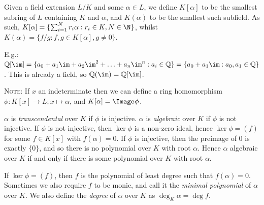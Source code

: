 \documentclass[a4paper, 10pt, twocolumn]{amsart}
\begin{document}
Given a field extension $L/K$ and some $\alpha \in L$, we define $K[\alpha]$ to be the smallest subring of $L$ containing $K$ and $\alpha$, and $K(\alpha)$ to be the smallest such subfield. As such, $K[\alpha] = \{\sum_{i=1}^N r_i \alpha : r_i \in K, N \in \N\}$, whilst $K(\alpha) = \{f/g : f,g \in K[\alpha], g\neq 0\}$.

E.g.: $\mathbb{Q}[\im] = \{a_0 + a_1\im + a_2\im^2 + \ldots + a_n\im^n :a_i\in\mathbb{Q}\} = \{a_0 + a_1\im : a_0, a_1 \in \mathbb{Q}\}$. This is already a field, so $\mathbb{Q}(\im) = \mathbb{Q}[\im]$.

\textsc{Note:} If $x$ an indeterminate then we can define a ring homomorphism $\phi:K[x] \rightarrow L; x\mapsto \alpha$, and $K[\alpha] = \Image \phi$.

$\alpha$ is \emph{transcendental} over $K$ if $\phi$ is injective. $\alpha$ is \emph{algebraic} over $K$ if $\phi$ is not injective. If $\phi$ is not injective, then $\ker\phi$ is a non-zero ideal, hence $\ker\phi = (f)$ for some $f\in K[x]$ with $f(\alpha) = 0$. If $\phi$ is injective, then the preimage of $0$ is exactly $\{0\}$, and so there is no polynomial over $K$ with root $\alpha$. Hence $\alpha$ algebraic over $K$ if and only if there is some polynomial over $K$ with root $\alpha$.

If $\ker \phi = (f)$, then $f$ is the polynomial of least degree such that $f(\alpha) = 0$. Sometimes we also require $f$ to be monic, and call it the \emph{minimal polynomial} of $\alpha$ over $K$. We also define the \emph{degree} of $\alpha$ over $K$ as $\deg_K \alpha = \deg f$.
\end{document}
